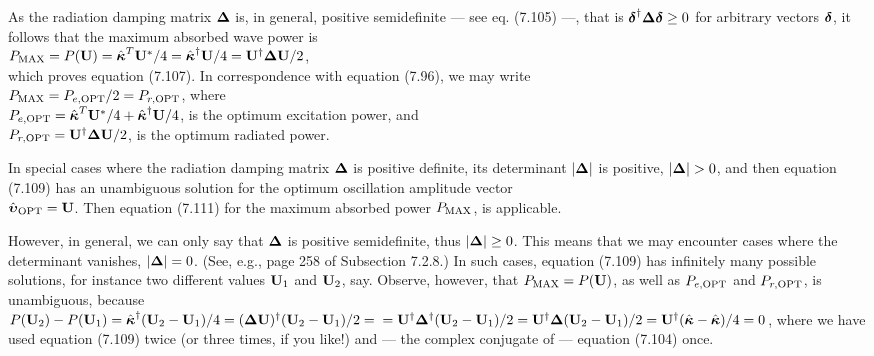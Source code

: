 \documentclass[a4paper,12pt]{article}
\newcommand{\bdelta}{\mbox{\boldmath ${\rm \delta}$}}
\newcommand{\bupsi}{\mbox{\boldmath ${\rm \upsilon}$}}
\newcommand{\bkappa}{\mbox{\boldmath $\rm \kappa$}}
\begin{document}
As the radiation damping matrix ${\bf \Delta}$ is, in general, positive semidefinite --- see eq. (7.105) ---, that is $\bdelta^{\dagger}{\bf \Delta}\bdelta \ge 0$ for arbitrary vectors $\bdelta$, it follows that the maximum absorbed wave power is \\
$
P_{\rm MAX} = P({\bf U}) = \hat{\bkappa}^T {\bf U}^* /4= \hat{\bkappa}^{\dagger} {\bf U} /4   
                      = {\bf U}^{\dagger}{\bf \Delta}{\bf U} /2
$, \\
which proves equation (7.107). In correspondence with equation (7.96), we may write \\
$P_{\rm MAX} =  P_{e,\rm OPT}/2 = P_{r,\rm OPT}$, where \\
$P_{e,\rm OPT} = \hat{\bkappa}^T {\bf U}^* /4 + \hat{\bkappa}^{\dagger} {\bf U} /4 $, is the optimum excitation power, and \\
$P_{r,\rm OPT}  = {\bf U}^{\dagger}{\bf \Delta}{\bf U} /2 $, is the optimum radiated power.

In special cases where the radiation damping matrix ${\bf \Delta}$ is positive definite, its determinant $|{\bf \Delta}|$ is positive, $|{\bf \Delta}| > 0$, and then equation (7.109) has an unambiguous solution for the optimum oscillation amplitude vector \\$\hat{\bupsi}_{\rm OPT}={\bf U}$. Then equation (7.111) for the maximum absorbed power $P_{\rm MAX}$, is applicable.


However, in general, we can only say that ${\bf \Delta}$ is positive semidefinite, thus $|{\bf \Delta}| \ge 0$. This means that we may encounter cases where the determinant vanishes, $|{\bf \Delta}| = 0$. (See, e.g., page 258 of Subsection 7.2.8.) In such cases, equation (7.109) has infinitely many possible solutions, for instance two different values ${\bf U}_1$ and ${\bf U}_2$, say. Observe, however, that $P_{\rm MAX} = P({\bf U})$, as well as $P_{e,\rm OPT}$ and $P_{r,\rm OPT}$, is unambiguous, because  \\
$P({\bf U}_2) - P({\bf U}_1) = 
\hat{\bkappa}^{\dagger} ({\bf U}_2 - {\bf U}_1) /4  = ({\bf \Delta}{\bf U})^{\dagger} ({\bf U}_2 - {\bf U}_1)/2 = \\ = {\bf U}^{\dagger}{\bf \Delta}^{\dagger} ({\bf U}_2 - {\bf U}_1)/2 = {\bf U}^{\dagger}{\bf \Delta} ({\bf U}_2 - {\bf U}_1)/2  =  {\bf U}^{\dagger} (\hat{\bkappa} - \hat{\bkappa})/4 = 0$, where we have used equation (7.109) twice (or three times, if you like!) and --- the complex conjugate of --- equation (7.104) once.
\vspace{0.3cm}
\end{document}
